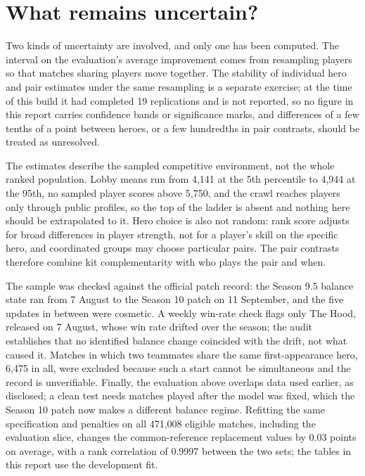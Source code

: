 \documentclass[11pt]{article}
\begin{document}
\section*{What remains uncertain?}

Two kinds of uncertainty are involved, and only one has been computed. The interval on the evaluation's
average improvement comes from resampling players so that matches sharing players move together. The
stability of individual hero and pair estimates under the same resampling is a separate exercise; at the
time of this build it had completed 19 replications and is not reported, so no figure in this
report carries confidence bands or significance marks, and differences of a few tenths of a point between
heroes, or a few hundredths in pair contrasts, should be treated as unresolved.

The estimates describe the sampled competitive environment, not the whole ranked population. Lobby means
run from 4,141 at the 5th percentile to 4,944 at the 95th, no sampled player scores above
5{,}750, and the crawl reaches players only through public profiles, so the top of the ladder is absent
and nothing here should be extrapolated to it. Hero choice is also not random: rank score adjusts for broad
differences in player strength, not for a player's skill on the specific hero, and coordinated groups may
choose particular pairs. The pair contrasts therefore combine kit complementarity with who plays the pair
and when.

The sample was checked against the official patch record: the Season 9.5 balance state ran from 7 August to
the Season 10 patch on 11 September, and the five updates in between were cosmetic. A weekly win-rate
check flags only The Hood, released on 7 August, whose win rate drifted over the season; the audit
establishes that no identified balance change coincided with the drift, not what caused it. Matches in
which two teammates share the same first-appearance hero, 6,475 in all, were excluded because such
a start cannot be simultaneous and the record is unverifiable. Finally, the evaluation above overlaps
data used earlier, as disclosed; a clean test needs matches played after the model was fixed, which the
Season 10 patch now makes a different balance regime. Refitting the same specification and penalties on all 471,008 eligible matches, including the evaluation slice, changes the common-reference replacement values by 0.03 points on average, with a rank correlation of 0.9997 between the two sets; the tables in this report use the development fit.
\end{document}
